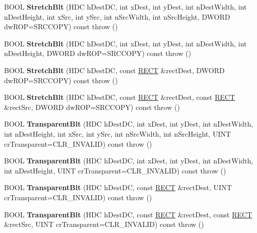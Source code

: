 \begin{DoxyCompactItemize}
B\+O\+OL {\bfseries Stretch\+Blt} (H\+DC h\+Dest\+DC, int x\+Dest, int y\+Dest, int n\+Dest\+Width, int n\+Dest\+Height, int x\+Src, int y\+Src, int n\+Src\+Width, int n\+Src\+Height, D\+W\+O\+RD dw\+R\+OP=S\+R\+C\+C\+O\+PY) const  throw ()
\item 
\mbox{\label{class_a_t_l_1_1_c_image_a5466daa65f6f3f1f44f658fd96b79b77}} 
B\+O\+OL {\bfseries Stretch\+Blt} (H\+DC h\+Dest\+DC, int x\+Dest, int y\+Dest, int n\+Dest\+Width, int n\+Dest\+Height, D\+W\+O\+RD dw\+R\+OP=S\+R\+C\+C\+O\+PY) const  throw ()
\item 
\mbox{\label{class_a_t_l_1_1_c_image_a9b917787eed52b9e8cd85b5b711a6a82}} 
B\+O\+OL {\bfseries Stretch\+Blt} (H\+DC h\+Dest\+DC, const \hyperlink{structtag_r_e_c_t}{R\+E\+CT} \&rect\+Dest, D\+W\+O\+RD dw\+R\+OP=S\+R\+C\+C\+O\+PY) const  throw ()
\item 
\mbox{\label{class_a_t_l_1_1_c_image_aa3b1221e17b29721ab48b4ddacc45ea5}} 
B\+O\+OL {\bfseries Stretch\+Blt} (H\+DC h\+Dest\+DC, const \hyperlink{structtag_r_e_c_t}{R\+E\+CT} \&rect\+Dest, const \hyperlink{structtag_r_e_c_t}{R\+E\+CT} \&rect\+Src, D\+W\+O\+RD dw\+R\+OP=S\+R\+C\+C\+O\+PY) const  throw ()
\item 
\mbox{\label{class_a_t_l_1_1_c_image_a89d7399c4b3379f2d53859ce9b45c9c8}} 
B\+O\+OL {\bfseries Transparent\+Blt} (H\+DC h\+Dest\+DC, int x\+Dest, int y\+Dest, int n\+Dest\+Width, int n\+Dest\+Height, int x\+Src, int y\+Src, int n\+Src\+Width, int n\+Src\+Height, U\+I\+NT cr\+Transparent=C\+L\+R\+\_\+\+I\+N\+V\+A\+L\+ID) const  throw ()
\item 
\mbox{\label{class_a_t_l_1_1_c_image_a740cafcfaf053ddfb0d6bf84ae7a0d3f}} 
B\+O\+OL {\bfseries Transparent\+Blt} (H\+DC h\+Dest\+DC, int x\+Dest, int y\+Dest, int n\+Dest\+Width, int n\+Dest\+Height, U\+I\+NT cr\+Transparent=C\+L\+R\+\_\+\+I\+N\+V\+A\+L\+ID) const  throw ()
\item 
\mbox{\label{class_a_t_l_1_1_c_image_aa4f3ccd33f596b01a3612c3b8fd49c46}} 
B\+O\+OL {\bfseries Transparent\+Blt} (H\+DC h\+Dest\+DC, const \hyperlink{structtag_r_e_c_t}{R\+E\+CT} \&rect\+Dest, U\+I\+NT cr\+Transparent=C\+L\+R\+\_\+\+I\+N\+V\+A\+L\+ID) const  throw ()
\item 
\mbox{\label{class_a_t_l_1_1_c_image_acc2ff4855ac61bbfec68f5e6df321896}} 
B\+O\+OL {\bfseries Transparent\+Blt} (H\+DC h\+Dest\+DC, const \hyperlink{structtag_r_e_c_t}{R\+E\+CT} \&rect\+Dest, const \hyperlink{structtag_r_e_c_t}{R\+E\+CT} \&rect\+Src, U\+I\+NT cr\+Transparent=C\+L\+R\+\_\+\+I\+N\+V\+A\+L\+ID) const  throw ()
\end{DoxyCompactItemize}
